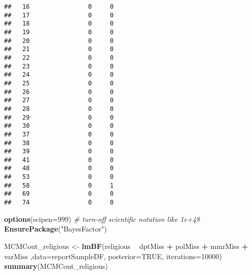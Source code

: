 \documentclass[]{article}
\newenvironment{Shaded}{\begin{snugshade}}{\end{snugshade}}
\newcommand{\CommentTok}[1]{\textcolor[rgb]{0.56,0.35,0.01}{\textit{#1}}}
\newcommand{\DataTypeTok}[1]{\textcolor[rgb]{0.13,0.29,0.53}{#1}}
\newcommand{\DecValTok}[1]{\textcolor[rgb]{0.00,0.00,0.81}{#1}}
\newcommand{\KeywordTok}[1]{\textcolor[rgb]{0.13,0.29,0.53}{\textbf{#1}}}
\newcommand{\NormalTok}[1]{#1}
\newcommand{\OperatorTok}[1]{\textcolor[rgb]{0.81,0.36,0.00}{\textbf{#1}}}
\newcommand{\OtherTok}[1]{\textcolor[rgb]{0.56,0.35,0.01}{#1}}
\newcommand{\StringTok}[1]{\textcolor[rgb]{0.31,0.60,0.02}{#1}}
\begin{document}
\begin{verbatim}
##   16                0     0
##   17                0     0
##   18                0     0
##   19                0     0
##   20                0     0
##   21                0     0
##   22                0     0
##   23                0     0
##   24                0     0
##   25                0     0
##   26                0     0
##   27                0     0
##   28                0     0
##   29                0     0
##   30                0     0
##   37                0     0
##   38                0     0
##   39                0     0
##   41                0     0
##   48                0     0
##   53                0     0
##   58                0     1
##   69                0     0
##   74                0     0
\end{verbatim}

\begin{Shaded}
\end{Shaded}

\begin{Shaded}
\begin{Highlighting}[]
\KeywordTok{options}\NormalTok{(}\DataTypeTok{scipen=}\DecValTok{999}\NormalTok{)  }\CommentTok{# turn-off scientific notation like 1e+48}
\KeywordTok{EnsurePackage}\NormalTok{(}\StringTok{"BayesFactor"}\NormalTok{)}

\NormalTok{MCMCout_religious <-}\StringTok{ }\KeywordTok{lmBF}\NormalTok{(religious }\OperatorTok{~}\StringTok{ }\NormalTok{dptMiss }\OperatorTok{+}\StringTok{ }\NormalTok{polMiss }\OperatorTok{+}\StringTok{ }\NormalTok{mmrMiss }\OperatorTok{+}\StringTok{ }\NormalTok{varMiss ,}\DataTypeTok{data=}\NormalTok{reportSampleDF, }\DataTypeTok{posterior=}\OtherTok{TRUE}\NormalTok{, }\DataTypeTok{iterations=}\DecValTok{10000}\NormalTok{)}
\KeywordTok{summary}\NormalTok{(MCMCout_religious)}
\end{Highlighting}
\end{Shaded}
\end{document}
